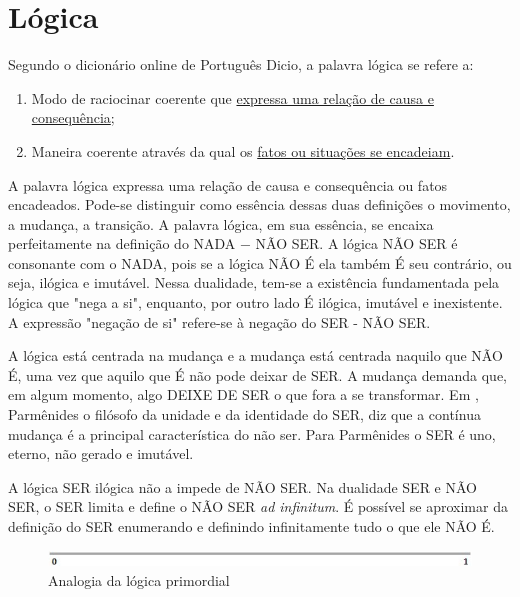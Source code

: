 \section{Lógica}
Segundo o dicionário online de Português Dicio\cite{dicio_logica}, a palavra lógica se refere a:
\begin{enumerate}
   \item Modo de raciocinar coerente que \underline{expressa uma relação de causa e consequência};
   \item Maneira coerente através da qual os \underline{fatos ou situações se encadeiam}. 
\end{enumerate}
 
\bigbreak
A palavra lógica expressa uma relação de causa e consequência ou fatos encadeados. Pode-se distinguir como essência dessas duas definições o movimento, a mudança, a transição. A palavra lógica, em sua essência, se encaixa perfeitamente na definição do NADA − NÃO SER.  A lógica NÃO SER é consonante com o NADA, pois se a lógica NÃO É ela também É seu contrário, ou seja, ilógica e imutável. Nessa dualidade, tem-se a existência fundamentada pela lógica que "nega a si", enquanto, por outro lado É ilógica, imutável e inexistente. A expressão "negação de si" refere-se à negação do SER - NÃO SER. 

A lógica está centrada na mudança e a mudança está centrada naquilo que NÃO É, uma vez que aquilo que É não pode deixar de SER. A mudança demanda que, em algum momento, algo DEIXE DE SER o que fora a se transformar. Em , Parmênides  o filósofo da unidade e da identidade do SER, diz que a contínua mudança é a principal característica do não ser. Para Parmênides o SER é uno, eterno, não gerado e imutável.

A lógica SER ilógica não a impede de NÃO SER.  Na dualidade SER e NÃO SER, o SER limita e define o NÃO SER \textit{ad infinitum}. É possível se aproximar da definição do SER enumerando e definindo infinitamente tudo o que ele NÃO É.

\begin{figure}[H]
\caption{Analogia da lógica primordial}
\label{fig:primordial_logic_representation}
\centering
\includegraphics[scale=1]{sections/images/primordial_logic_representation.jpg}
\end{figure}

